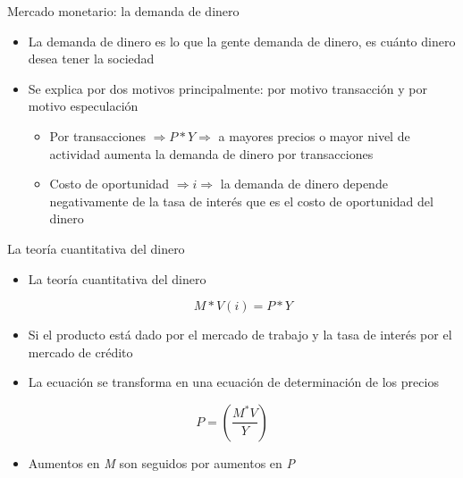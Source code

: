 \documentclass{beamer}
\begin{document}
\begin{frame}{Mercado monetario: la demanda de dinero}
    \begin{itemize}
        \item La demanda de dinero es lo que la gente demanda de dinero, es cuánto dinero desea tener la sociedad
        \item Se explica por dos motivos principalmente: por motivo transacción y por motivo especulación
        \begin{itemize}
        \item Por transacciones $\Rightarrow P*Y \Rightarrow$ a mayores precios o mayor nivel de actividad aumenta la demanda de dinero por transacciones
        \item Costo de oportunidad $\Rightarrow i \Rightarrow $ la demanda de dinero depende negativamente de la tasa de interés que es el costo de oportunidad del dinero
    \end{itemize}
    \end{itemize}
\end{frame}


\begin{frame}{La teoría cuantitativa del dinero}
\begin{itemize}
        \item La teoría cuantitativa del dinero
        \vspace{0.3cm}
                \begin{tcolorbox}[width=4in,
                  interior hidden,
                  boxsep=0pt,
                  left=0pt,
                  right=0pt,
                  top=2pt,
                  ]%
                                 $$M*V(i)=P*Y$$
                \end{tcolorbox} 
        \item Si el producto está dado por el mercado de trabajo y la tasa de interés por el mercado de crédito
        \item La ecuación se transforma en una ecuación de determinación de los precios
    \end{itemize}
    \begin{itemize}
    \begin{tcolorbox}[width=4in,
                  interior hidden,
                  boxsep=0pt,
                  left=0pt,
                  right=0pt,
                  top=2pt,
                  ]%
                                 $$P=\left(\frac{M^{*} V}{Y}\right)$$
                \end{tcolorbox} 
    \end{itemize}
    \begin{itemize}
        \item Aumentos en \textit{M} son seguidos por aumentos en \textit{P}
    \end{itemize}
\end{frame}
\end{document}
